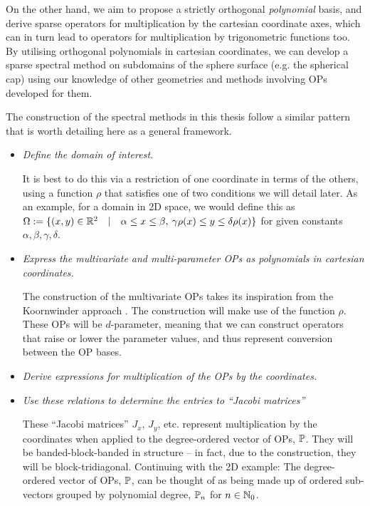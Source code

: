 On the other hand, we aim to propose a strictly orthogonal \textit{polynomial} basis, and derive sparse operators for multiplication by the cartesian coordinate axes, which can in turn lead to operators for multiplication by trigonometric functions too. By utilising orthogonal polynomials in cartesian coordinates, we can develop a sparse spectral method on subdomains of the sphere surface (e.g. the spherical cap) using our knowledge of other geometries and methods involving OPs developed for them.


The construction of the spectral methods in this thesis follow a similar pattern that is worth detailing here as a general framework.
\begin{itemize}
	\item \textit{Define the domain of interest.}
	
		It is best to do this via a restriction of one coordinate in terms of the others, using a function $\rho$ that satisfies one of two conditions we will detail later. As an example, for a domain in 2D space, we would define this as $\Omega := \{ (x,y) \in \mathbb{R}^2 \quad | \quad \alpha \le x \le \beta, \: \gamma \rho(x) \le y \le \delta \rho(x) \}$ for given constants $\alpha, \beta, \gamma, \delta$.
	
	\item \textit{Express the multivariate and multi-parameter OPs as polynomials in cartesian coordinates.}
	
		The construction of the multivariate OPs takes its inspiration from the Koornwinder approach \cite{koornwinder1975two}. The construction will make use of the function $\rho$. These OPs will be $d$-parameter, meaning that we can construct operators that raise or lower the parameter values, and thus represent conversion between the OP bases.
	
	\item \textit{Derive expressions for multiplication of the OPs by the coordinates.}
	
	\item \textit{Use these relations to determine the entries to \enquote{Jacobi matrices}}
	
		These \enquote{Jacobi matrices} $J_x$, $J_y$, etc. represent multiplication by the coordinates when applied to the degree-ordered vector of OPs, $\mathbb{P}$. They will be banded-block-banded in structure -- in fact, due to the construction, they will be block-tridiagonal. Continuing with the 2D example:
		The degree-ordered vector of OPs, $\mathbb{P}$, can be thought of as being made up of ordered sub-vectors grouped by polynomial degree, $\mathbb{P}_n$ for $n \in \mathbb{N}_0$.
		

\end{itemize}

